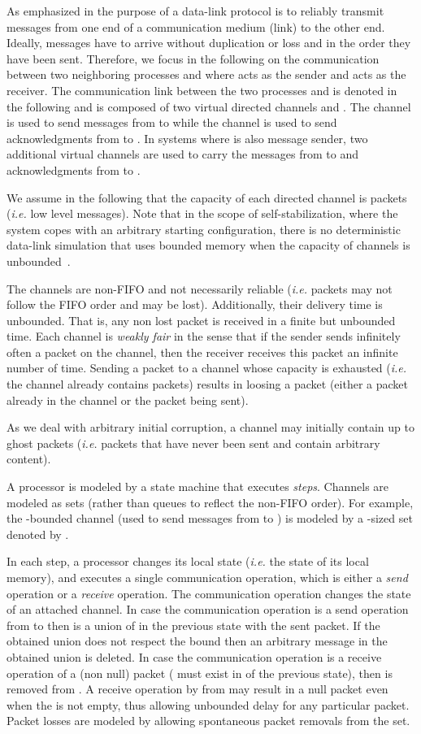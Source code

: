 \documentclass[11pt]{article}
\begin{document}
As emphasized in \cite{AB93j} the purpose of a data-link protocol is to reliably transmit messages from one end of a communication medium (link) to the other end. Ideally, messages have to arrive without duplication or loss and in the order they have been sent. Therefore, we focus in the following on the communication between two neighboring processes  and  where  acts as the sender and  acts as the receiver. The communication link between the two processes  and  is denoted in the following  and is composed of two virtual directed channels  and . The channel  is used to send messages from  to  while the channel  is used to send acknowledgments from  to . In systems where  is also message sender, two additional virtual channels are used to carry the messages from  to  and acknowledgments from  to .

We assume in the following that the capacity of each directed channel is  packets (\emph{i.e.} low level messages). Note that in the scope of self-stabilization, where the system copes with an arbitrary starting configuration, there is no deterministic data-link simulation that uses bounded memory when the capacity of channels is unbounded~\cite{GM91j,DIM97j}.

The channels are non-FIFO and not necessarily reliable (\emph{i.e. } packets may not follow the FIFO order and may be lost). Additionally, their delivery time is unbounded. That is, any non lost packet is received in a finite but unbounded time. Each channel  is \emph{weakly fair} in the sense that if the sender sends infinitely often a packet on the channel, then the receiver receives this packet an infinite number of time. Sending a packet to a channel whose capacity is exhausted (\emph{i.e.} the channel already contains  packets) results in loosing a packet (either a packet already in the channel or the packet being sent). 

As we deal with arbitrary initial corruption, a channel may initially contain up to  ghost packets (\emph{i.e.} packets that have never been sent and contain arbitrary content).

A processor is modeled by a state machine that executes \emph{steps}. Channels are modeled as sets (rather than queues to reflect the non-FIFO order). For example, the -bounded channel  (used to send messages from  to ) is modeled by a -sized set denoted by .

In each step, a processor changes its local state (\emph{i.e.} the state of its local memory), and executes a single communication operation, which is either a {\em send}  operation or a {\em receive} operation. The communication operation changes the state of an attached channel. In case the communication operation is a send operation from  to  then  is a union of  in the previous state with the sent packet. If the obtained union does not respect the bound  then an arbitrary message in the obtained union is deleted. In case the communication operation is a receive operation of a (non null) packet  ( must exist in  of the previous state), then  is removed from . A receive operation by  from  may result in a null packet even when the  is not empty, thus allowing unbounded delay for any particular packet. Packet losses are modeled by allowing spontaneous packet removals from the set.
 
\end{document}
